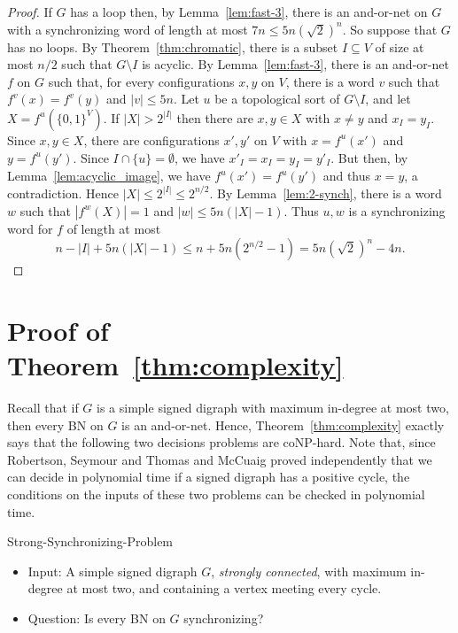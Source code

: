 \documentclass[11pt,letter]{article}
\newcommand{\B}{\{0,1\}}
\begin{document}
\begin{proof}
If $G$ has a loop then, by Lemma~\ref{lem:fast-3}, there is an and-or-net on $G$ with a synchronizing word of length at most $7n\leq 5n(\sqrt{2})^n$. So suppose that $G$ has no loops. By Theorem~\ref{thm:chromatic}, there is a subset $I\subseteq V$ of size at most $n/2$ such that $G\setminus I$ is acyclic. By Lemma~\ref{lem:fast-3}, there is an and-or-net $f$ on $G$ such that, for every configurations $x,y$ on $V$, there is a word $v$ such that $f^v(x)=f^v(y)$ and $|v|\leq 5n$. Let $u$ be a topological sort of $G\setminus I$, and let $X=f^u(\B^V)$. If $|X|>2^{|I|}$ then there are $x,y\in X$ with $x\neq y$ and $x_I=y_I$. Since $x,y\in X$, there are configurations $x',y'$ on $V$ with $x=f^u(x')$ and $y=f^u(y')$. Since $I\cap\{u\}=\emptyset$, we have $x'_I=x_I=y_I=y'_I$. But then, by Lemma~\ref{lem:acyclic_image}, we have $f^u(x')=f^u(y')$ and thus $x=y$, a contradiction. Hence $|X|\leq 2^{|I|}\leq 2^{n/2}$. By Lemma~\ref{lem:2-synch}, there is a word $w$ such that $|f^w(X)|=1$ and $|w|\leq 5n(|X|-1)$. Thus $u,w$ is a synchronizing word for $f$ of length at most 
\[
n-|I|+5n(|X|-1)\leq n+5n(2^{n/2}-1)= 5n(\sqrt{2})^n-4n.
\] 
\end{proof}

\section{Proof of Theorem~\ref{thm:complexity}}\label{sec:complexity}

Recall that if $G$ is a simple signed digraph with maximum in-degree at most two, then every BN on $G$ is an and-or-net. Hence, Theorem~\ref{thm:complexity} exactly says that the following two decisions problems are coNP-hard. Note that, since Robertson, Seymour and Thomas \cite{RST99} and McCuaig \cite{McC04} proved independently that we can decide in polynomial time if a signed digraph has a positive cycle, the conditions on the inputs of these two problems can be checked in polynomial time.

\bigskip
\begin{minipage}{13.5cm}
{\sc Strong-Synchronizing-Problem}
\begin{itemize}
\item
{\sc Input:} A simple signed digraph $G$, {\em strongly connected}, with maximum in-degree at most two, and containing a vertex meeting every cycle.
\item
{\sc Question:} Is every BN on $G$ synchronizing? 
\end{itemize}
\end{minipage}
\end{document}
